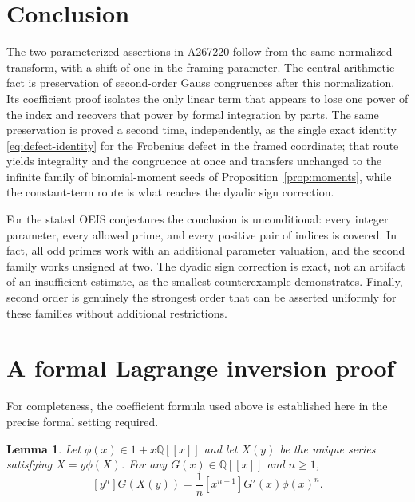 \documentclass[11pt,letterpaper]{article}
\numberwithin{equation}{section}
\newtheorem{lemma}[theorem]{Lemma}
\theoremstyle{definition}
\newcommand{\Q}{\mathbb Q}
\begin{document}
\section{Conclusion}

The two parameterized assertions in A267220 follow from the same
normalized transform, with a shift of one in the framing parameter.
The central arithmetic fact is preservation of second-order Gauss
congruences after this normalization. Its coefficient proof isolates
the only linear term that appears to lose one power of the index and
recovers that power by formal integration by parts. The same preservation
is proved a second time, independently, as the single exact identity
\eqref{eq:defect-identity} for the Frobenius defect in the framed
coordinate; that route yields integrality and the congruence at once and
transfers unchanged to the infinite family of binomial-moment seeds of
Proposition~\ref{prop:moments}, while the constant-term route is what
reaches the dyadic sign correction.

For the stated OEIS conjectures the conclusion is unconditional: every
integer parameter, every allowed prime, and every positive pair of
indices is covered. In fact, all odd primes work with an additional
parameter valuation, and the second family works unsigned at two.
The dyadic sign correction is exact, not an artifact of an insufficient
estimate, as the smallest counterexample demonstrates. Finally,
second order is genuinely the strongest order that can be asserted
uniformly for these families without additional restrictions.

\appendix
\section{A formal Lagrange inversion proof}\label{app:lagrange}

For completeness, the coefficient formula used above is established
here in the precise formal setting required.

\begin{lemma}\label{lem:lagrange}
Let $\phi(x)\in1+x\Q[[x]]$ and let $X(y)$ be the unique series satisfying
$X=y\phi(X)$. For any $G(x)\in\Q[[x]]$ and $n\geq1$,
\begin{equation}\label{eq:lagrange}
[y^n]G(X(y))=\frac1n[x^{n-1}]G'(x)\phi(x)^n.
\end{equation}
\end{lemma}
\end{document}

